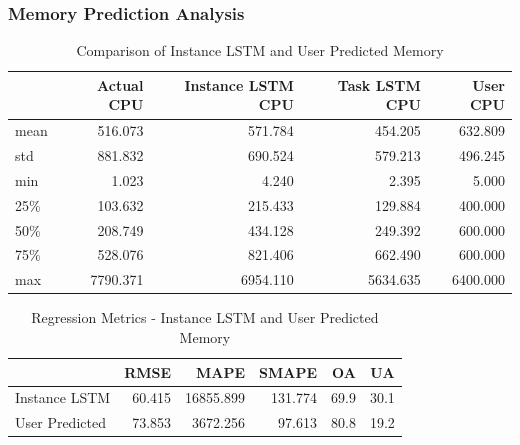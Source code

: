     \subsubsection{Memory Prediction Analysis}
    \label{sec:mem-prediction-analysis-instance-knowledge-lstm-evaluation}

      \begin{table}
        \centering
        \caption{Comparison of Instance LSTM and User Predicted Memory}
        \label{tab:comparison-instance-lstm-user-predicted-memory}

        \begin{tabular}{|l|rrrr|}
          \toprule
          {} &  Actual CPU &  Instance LSTM CPU &  Task LSTM CPU &  User CPU \\
          \midrule
          mean &     516.073 &            571.784 &        454.205 &   632.809 \\
          std  &     881.832 &            690.524 &        579.213 &   496.245 \\
          min  &       1.023 &              4.240 &          2.395 &     5.000 \\
          25\%  &     103.632 &            215.433 &        129.884 &   400.000 \\
          50\%  &     208.749 &            434.128 &        249.392 &   600.000 \\
          75\%  &     528.076 &            821.406 &        662.490 &   600.000 \\
          max  &    7790.371 &           6954.110 &       5634.635 &  6400.000 \\
          \bottomrule
          \end{tabular}
      \end{table}
      
      \begin{table}
        \centering
        \caption{Regression Metrics - Instance LSTM and User Predicted Memory}
        \label{tab:regression-metrics-instance-lstm-user-predicted-memory}

        \begin{tabular}{|l|rrrrr|}
          \toprule
          {} &    RMSE &       MAPE &    SMAPE &    OA &    UA \\
          \midrule
          Instance LSTM   &  60.415 &  16855.899 &  131.774 &  69.9 &  30.1 \\
          User Predicted &  73.853 &   3672.256 &   97.613 &  80.8 &  19.2 \\
          \bottomrule
          \end{tabular}
      \end{table}

